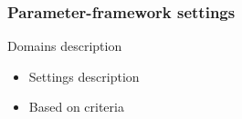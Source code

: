 \begin{frame}
    \frametitle{Parameter-framework settings}
    \begin{minipage}{0.40\textwidth}
    \begin{block}{Domains description}
        \begin{itemize}
            \item Settings description
            \item Based on criteria
        \end{itemize}
    \end{block}
    \end{minipage}
    \begin{minipage}{0.53\textwidth}
        
    \end{minipage}
\end{frame}
